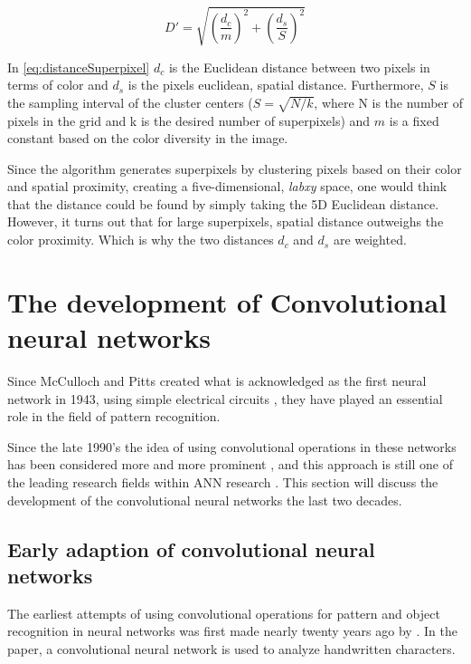 \begin{equation}
	D'=\sqrt{\left(\frac{d_{c}}{m}\right)^{2} + \left(\frac{d_{s}}{S}\right)^{2}}
	\label{eq:distanceSuperpixel}
\end{equation}

In \autoref{eq:distanceSuperpixel} $d_{c}$ is the Euclidean distance between two pixels in terms of color and $d_{s}$ is the pixels euclidean, spatial distance. Furthermore, $S$ is the sampling interval of the cluster centers ($S = \sqrt{N/k}$, where N is the number of pixels in the grid and k is the desired number of superpixels) and $m$ is a fixed constant based on the color diversity in the image.

Since the algorithm generates superpixels by clustering pixels based on their color and spatial proximity, creating a five-dimensional, \textit{labxy} space, one would think that the distance could be found by simply taking the 5D Euclidean distance. However, it turns out that for large superpixels, spatial distance outweighs the color proximity. Which is why the two distances $d_{c}$ and $d_{s}$ are weighted.

\section{The development of Convolutional neural networks}
Since McCulloch and Pitts created what is acknowledged as the first neural network in 1943, using simple electrical circuits \citep{Mcculloch1990}, they have played an essential role in the field of pattern recognition. 

Since the late 1990's the idea of using convolutional operations in these networks has been considered more and more prominent \citep{LeC}, and this approach is still one of the leading research fields within ANN research \citep{Wu2017}. This section will discuss the development of the convolutional neural networks the last two decades.

\subsection{Early adaption of convolutional neural networks}
The earliest attempts of using convolutional operations for pattern and object recognition in neural networks was first made nearly twenty years ago by \cite{LeC}. In the paper, a convolutional neural network is used to analyze handwritten characters.

